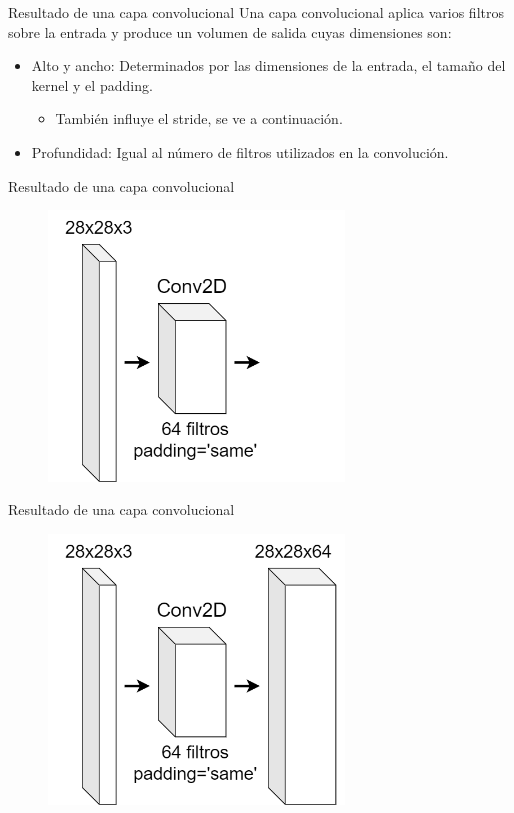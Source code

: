\begin{frame}{Resultado de una capa convolucional}
Una \alert{capa convolucional} aplica varios filtros sobre la entrada y produce un volumen de salida cuyas dimensiones son:
\begin{itemize}
    \item \alert{Alto y ancho}: Determinados por las dimensiones de la \alert{entrada}, el tamaño del \alert{kernel} y el \alert{padding}.
    \begin{itemize}
        \item También influye el \alert{stride}, se ve a continuación.
    \end{itemize}
    \item \alert{Profundidad}: Igual al \alert{número de filtros} utilizados en la convolución.
\end{itemize}
\end{frame}

\begin{frame}{Resultado de una capa convolucional}
\begin{figure}
    \centering
    \includegraphics[width=0.7\textwidth]{Slides/figures/Tema 3/ConvDimensions_1.png}
\end{figure}
\end{frame}

\begin{frame}{Resultado de una capa convolucional}
\begin{figure}
    \centering
    \includegraphics[width=0.7\textwidth]{Slides/figures/Tema 3/ConvDimensions_2.png}
\end{figure}
\end{frame}

